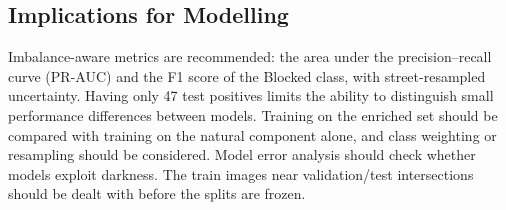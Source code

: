 \subsection{Implications for Modelling}
Imbalance-aware metrics are recommended: the area under the precision--recall curve (PR-AUC) and the F1 score of the Blocked class, with street-resampled uncertainty. Having only 47 test positives limits the ability to distinguish small performance differences between models. Training on the enriched set should be compared with training on the natural component alone, and class weighting or resampling should be considered. Model error analysis should check whether models exploit darkness. The train images near validation/test intersections should be dealt with before the splits are frozen.

\appendix
\needspace{0.3\textheight}
